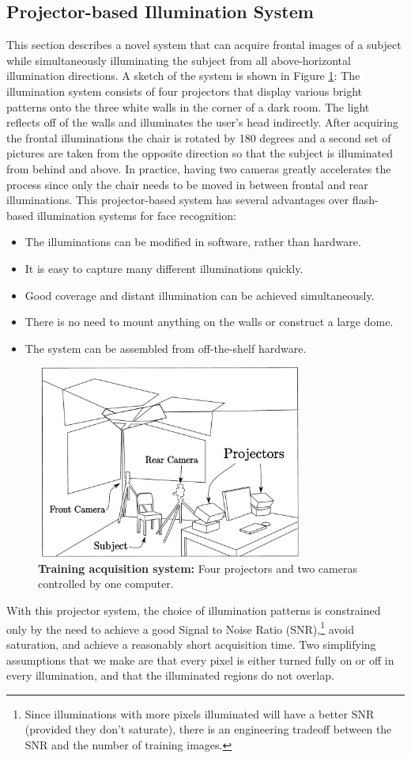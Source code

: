 \subsection{Projector-based Illumination System}
%
This section describes a novel system that can acquire frontal images of a
subject while simultaneously illuminating the subject from all above-horizontal
illumination directions. A sketch of the system is shown in Figure
\ref{fig:system}: The illumination system consists of four projectors that
display various bright patterns onto the three white walls in the corner of a
dark room.  The light reflects off of the walls and illuminates the user's head
indirectly.  After acquiring the frontal illuminations the chair is rotated by
180 degrees and a second set of pictures are taken from the opposite direction
so that the subject is illuminated from behind and above.  In practice, having
two cameras greatly accelerates the process since only the chair needs to be
moved in between frontal and rear illuminations. This projector-based system
has several advantages over flash-based illumination systems for face
recognition:
\begin{itemize}
\item The illuminations can be modified in software, rather than hardware.
\item It is easy to capture many different illuminations quickly.
\item Good coverage and distant illumination can be achieved simultaneously.
\item There is no need to mount anything on the walls or construct a large dome.
\item The system can be assembled from off-the-shelf hardware.
\end{itemize}
\begin{figure}
\centering
\includegraphics[height=2.5in]{figures_pami/camera_rig.pdf}
\caption{\small{\bf Training acquisition system:} Four projectors and two cameras controlled by one computer.}
\label{fig:system}
\end{figure}
%
With this projector system, the choice of illumination patterns is constrained
only by the need to achieve a good Signal to Noise Ratio (SNR),\footnote{Since
illuminations with more pixels illuminated will have a better SNR (provided
they don't saturate), there is an engineering tradeoff between the SNR and the
number of training images.} avoid saturation, and achieve a reasonably short
acquisition time.  Two simplifying assumptions that we make are that every
pixel is either turned fully on or off in every illumination, and that the
illuminated regions do not overlap.

